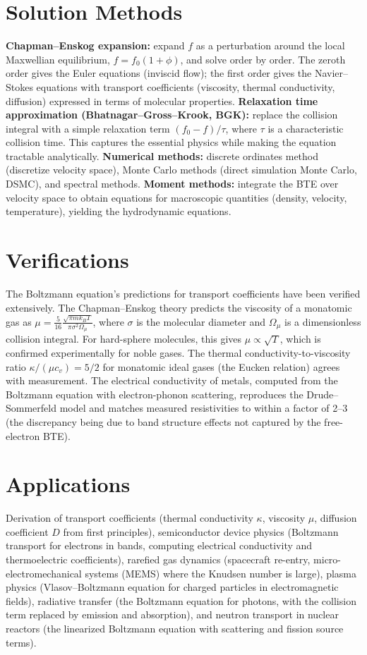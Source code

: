 \section*{Solution Methods}

\textbf{Chapman--Enskog expansion:} expand $f$ as a perturbation around the local Maxwellian equilibrium, $f = f_0(1 + \phi)$, and solve order by order. The zeroth order gives the Euler equations (inviscid flow); the first order gives the Navier--Stokes equations with transport coefficients (viscosity, thermal conductivity, diffusion) expressed in terms of molecular properties. \textbf{Relaxation time approximation (Bhatnagar--Gross--Krook, BGK):} replace the collision integral with a simple relaxation term $(f_0 - f)/\tau$, where $\tau$ is a characteristic collision time. This captures the essential physics while making the equation tractable analytically. \textbf{Numerical methods:} discrete ordinates method (discretize velocity space), Monte Carlo methods (direct simulation Monte Carlo, DSMC), and spectral methods. \textbf{Moment methods:} integrate the BTE over velocity space to obtain equations for macroscopic quantities (density, velocity, temperature), yielding the hydrodynamic equations.
\section*{Verifications}

The Boltzmann equation's predictions for transport coefficients have been verified extensively. The Chapman--Enskog theory predicts the viscosity of a monatomic gas as $\mu = \frac{5}{16}\frac{\sqrt{\pi mk_BT}}{\pi\sigma^2\Omega_\mu}$, where $\sigma$ is the molecular diameter and $\Omega_\mu$ is a dimensionless collision integral. For hard-sphere molecules, this gives $\mu \propto \sqrt{T}$, which is confirmed experimentally for noble gases. The thermal conductivity-to-viscosity ratio $\kappa/(\mu c_v) = 5/2$ for monatomic ideal gases (the Eucken relation) agrees with measurement. The electrical conductivity of metals, computed from the Boltzmann equation with electron-phonon scattering, reproduces the Drude--Sommerfeld model and matches measured resistivities to within a factor of 2--3 (the discrepancy being due to band structure effects not captured by the free-electron BTE).
\section*{Applications}

Derivation of transport coefficients (thermal conductivity $\kappa$, viscosity $\mu$, diffusion coefficient $D$ from first principles), semiconductor device physics (Boltzmann transport for electrons in bands, computing electrical conductivity and thermoelectric coefficients), rarefied gas dynamics (spacecraft re-entry, micro-electromechanical systems (MEMS) where the Knudsen number is large), plasma physics (Vlasov--Boltzmann equation for charged particles in electromagnetic fields), radiative transfer (the Boltzmann equation for photons, with the collision term replaced by emission and absorption), and neutron transport in nuclear reactors (the linearized Boltzmann equation with scattering and fission source terms).

